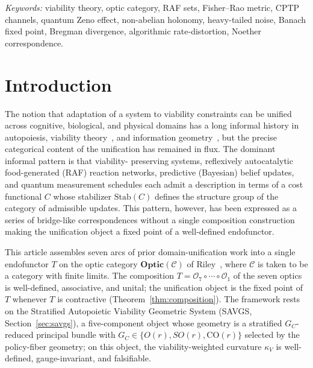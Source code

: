 \documentclass[11pt,a4paper]{article}
\theoremstyle{plain}
\theoremstyle{definition}
\theoremstyle{remark}
\newcommand{\kk}{\kappa_{\!V}}
\newcommand{\OO}{\mathcal{O}}
\newcommand{\CC}{\mathcal{C}}
\newcommand{\CO}{\mathrm{CO}}
\newcommand{\Stab}{\mathrm{Stab}}
\newcommand{\Optic}{\mathbf{Optic}}
\begin{document}
\vspace{0.6em}
\noindent\textit{Keywords:} viability theory, optic category, RAF sets,
Fisher--Rao metric, CPTP channels, quantum Zeno effect, non-abelian
holonomy, heavy-tailed noise, Banach fixed point, Bregman divergence,
algorithmic rate-distortion, Noether correspondence.

\vspace{0.9em}

\section{Introduction}\label{sec:intro}

The notion that adaptation of a system to viability constraints can be
unified across cognitive, biological, and physical domains has a long
informal history in autopoiesis, viability theory~\cite{aubin2011}, and
information geometry~\cite{chentsov1982,amari2000}, but the precise
categorical content of the unification has remained in flux. The dominant informal pattern is that viability-
preserving systems, reflexively autocatalytic food-generated (RAF)
reaction networks, predictive (Bayesian) belief updates, and quantum
measurement schedules each admit a description in terms of a cost
functional $C$ whose stabilizer $\Stab(C)$ defines the structure group of
the category of admissible updates. This pattern, however, has been
expressed as a series of bridge-like correspondences without a single
composition construction making the unification object a fixed point of
a well-defined endofunctor.

This article assembles seven arcs of prior domain-unification work into
a single endofunctor $T$ on the optic category $\Optic(\CC)$ of
Riley~\cite{riley2018optics},
where $\CC$ is taken to be a category with finite limits. The composition
$T = \OO_7 \circ \cdots \circ \OO_1$ of the seven optics is
well-defined, associative, and unital; the unification object is the
fixed point of $T$ whenever $T$ is contractive (Theorem~\ref{thm:composition}).
The framework rests on the Stratified Autopoietic Viability Geometric
System (SAVGS, Section~\ref{sec:savgs}), a five-component object whose
geometry is a stratified $G_C$-reduced principal bundle with $G_C \in \{O(r), SO(r), \CO(r)\}$ selected by the policy-fiber geometry; on this object,
the viability-weighted curvature $\kk$ is well-defined, gauge-invariant,
and falsifiable.
\end{document}
